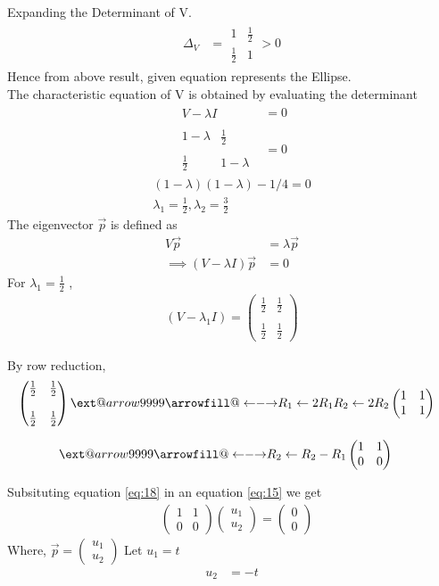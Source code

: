 \documentclass[journal,12pt,twocolumn]{IEEEtran}
\makeatletter
\newcommand\xleftrightarrow[2][]{%
  \ext@arrow 9999{\longleftrightarrowfill@}{#1}{#2}}
\newcommand\longleftrightarrowfill@{%
  \arrowfill@\leftarrow\relbar\rightarrow}
\newcommand{\myvec}[1]{\ensuremath{\begin{pmatrix}#1\end{pmatrix}}}
\makeatother
\begin{document}
Expanding the Determinant of V.
\begin{align}
    \Delta_{V} &= \begin{array}{|cc|}
1 &\frac{1}{2}\\\frac{1}{2} & 1
\end{array}>0
\end{align}
Hence from above result, given equation represents the Ellipse.\\
The characteristic equation of V is obtained by evaluating the determinant 
\begin{align}
\begin{array}{|c|}
V-\lambda I
\end{array}&=0\\
\begin{array}{|cc|}
1-\lambda & \frac{1}{2} \\\\ \frac{1}{2} & 1-\lambda
\end{array}&=0
\end{align}
\begin{align}
(1-\lambda)(1-\lambda)-1/4=0\\
\lambda_{1}=\frac{1}{2},   \lambda_{2}=\frac{3}{2} \label{eq:13}
\end{align}
The eigenvector $\vec{p}$ is defined as 
\begin{align}
    V\vec{p}&=\lambda\vec{p}\\
    \implies (V-\lambda I)\vec{p}&=0 \label{eq:15}
\end{align}
For $\lambda_1=\frac{1}{2}$ ,
\begin{align}
    (V-\lambda_1I)=\myvec{\frac{1}{2} & \frac{1}{2} \\\\\frac{1}{2} & \frac{1}{2}}
\end{align}

 By row reduction,
\begin{align}
&\myvec{\frac{1}{2} & \frac{1}{2}\\ \\ \frac{1}{2} & \frac{1}{2}}
\xleftrightarrow[R_1\leftarrow 2R_1]{R_2\leftarrow 2R_2}
\myvec{1 & 1 \\ 1 & 1}
\end{align}

\begin{align}
&\xleftrightarrow{R_2\leftarrow R_2 - R_1}
\myvec{1 & 1 \\ 0 & 0 } \label{eq:18}
\end{align}

Subsituting equation \eqref{eq:18} in an equation \eqref{eq:15} we get
\begin{align}
        &   \myvec{1 & 1 \\ 0& 0}\myvec{u_1 \\ u_2}=\myvec{0 \\ 0}
\end{align}
Where, $\vec{p}=\myvec{u_1\\u_2}$
Let $u_1=t$
\begin{align}
    u_2&=-t
\end{align}
\end{document}
